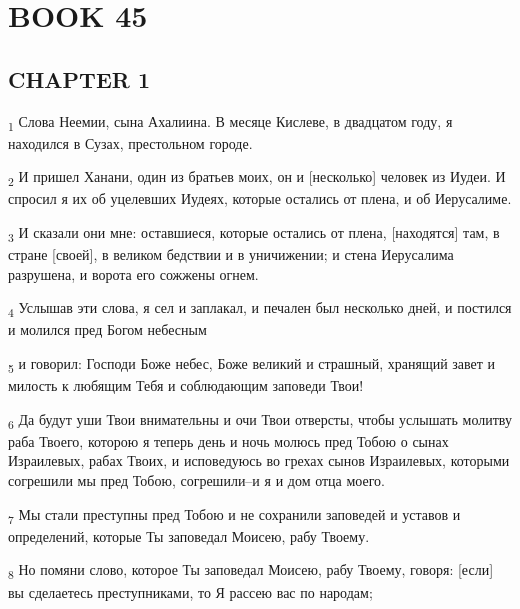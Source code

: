 \section{BOOK 45}
\subsection{CHAPTER 1}
\begin{tcolorbox}
\textsubscript{1} Слова Неемии, сына Ахалиина. В месяце Кислеве, в двадцатом году, я находился в Сузах, престольном городе.
\end{tcolorbox}
\begin{tcolorbox}
\textsubscript{2} И пришел Ханани, один из братьев моих, он и [несколько] человек из Иудеи. И спросил я их об уцелевших Иудеях, которые остались от плена, и об Иерусалиме.
\end{tcolorbox}
\begin{tcolorbox}
\textsubscript{3} И сказали они мне: оставшиеся, которые остались от плена, [находятся] там, в стране [своей], в великом бедствии и в уничижении; и стена Иерусалима разрушена, и ворота его сожжены огнем.
\end{tcolorbox}
\begin{tcolorbox}
\textsubscript{4} Услышав эти слова, я сел и заплакал, и печален был несколько дней, и постился и молился пред Богом небесным
\end{tcolorbox}
\begin{tcolorbox}
\textsubscript{5} и говорил: Господи Боже небес, Боже великий и страшный, хранящий завет и милость к любящим Тебя и соблюдающим заповеди Твои!
\end{tcolorbox}
\begin{tcolorbox}
\textsubscript{6} Да будут уши Твои внимательны и очи Твои отверсты, чтобы услышать молитву раба Твоего, которою я теперь день и ночь молюсь пред Тобою о сынах Израилевых, рабах Твоих, и исповедуюсь во грехах сынов Израилевых, которыми согрешили мы пред Тобою, согрешили--и я и дом отца моего.
\end{tcolorbox}
\begin{tcolorbox}
\textsubscript{7} Мы стали преступны пред Тобою и не сохранили заповедей и уставов и определений, которые Ты заповедал Моисею, рабу Твоему.
\end{tcolorbox}
\begin{tcolorbox}
\textsubscript{8} Но помяни слово, которое Ты заповедал Моисею, рабу Твоему, говоря: [если] вы сделаетесь преступниками, то Я рассею вас по народам;
\end{tcolorbox}
